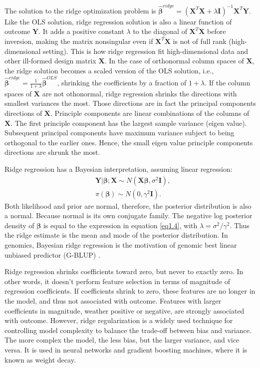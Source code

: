 The solution to the ridge optimization problem is $\hat{\bm{\beta}}^{ridge}=(\bm{X}^T\bm{X}+\lambda \bm{I})^{-1}\bm{X}^T\bm{Y}$. Like the OLS solution, ridge regression solution is also a linear function of outcome $\bm{Y}$. It adds a positive constant $\lambda$ to the diagonal of $\bm{X}^T\bm{X}$ before inversion, making the matrix nonsingular even if $\bm{X}^T\bm{X}$ is not of full rank (high-dimensional setting). This is how ridge regression fit high-dimensional data and other ill-formed design matrix $\bm{X}$. In the case of orthonormal column spaces of $\bm{X}$, the ridge solution becomes a scaled version of the OLS solution, i.e., $\hat{\bm{\beta}}^{ridge}=\frac{1}{1+\lambda}\hat{\bm{\beta}}^{OLS}$, shrinking the coefficients by a fraction of $1+\lambda$. If the column spaces of $\bm{X}$ are not othonormal, ridge regression shrinks the directions with smallest variances the most. Those directions are in fact the principal components directions of $\bm{X}$. Principle components are linear combinations of the columns of $\bm{X}$. The first principle component has the largest sample variance (eigen value). Subsequent principal components have maximum variance subject to being orthogonal to the earlier ones. Hence, the small eigen value principle components directions are shrunk the most. 

Ridge regression has a Bayesian interpretation, assuming linear regression:
\begin{align*}
    &\bm{Y}|\bm{\beta};\bm{X} \sim N(\bm{X\beta}, \sigma^2\bm{I}), \\
    &\pi(\bm{\beta}) \sim N(0, \gamma^2\bm{I}).
\end{align*}
Both likelihood and prior are normal, therefore, the posterior distribution is also a normal. Because normal is its own conjugate family. The negative log posterior density of $\bm{\beta}$ is equal to the expression in equation \eqref{eq1.4}, with $\lambda=\sigma^2/\gamma^2$. Thus the ridge estimate is the mean and mode of the posterior distribution. In genomics, Bayesian ridge regression is the motivation of genomic best linear unbiased predictor (G-BLUP) \citep{de2013prediction}. 

Ridge regression shrinks coefficients toward zero, but never to exactly zero. In other words, it doesn't perform feature selection in terms of magnitude of regression coefficients. If coefficients shrink to zero, these features are no longer in the model, and thus not associated with outcome. Features with larger coefficients in magnitude, weather positive or negative, are strongly associated with outcome. However, ridge regularization is a widely used technique for controlling model complexity to balance the trade-off between bias and variance. The more complex the model, the less bias, but the larger variance, and vice versa. It is used in neural networks and gradient boosting machines, where it is known as weight decay.    

